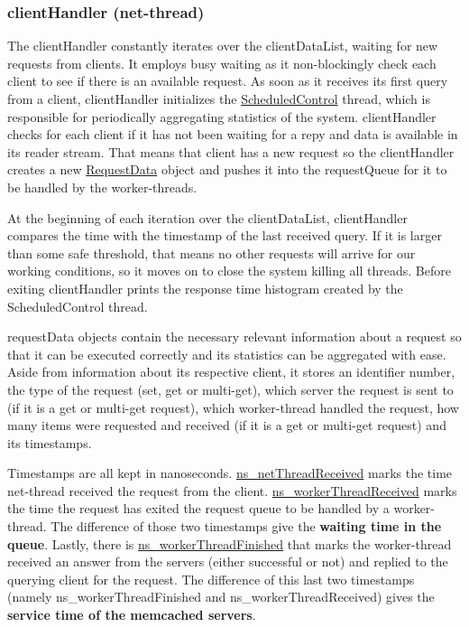 \documentclass[11pt,a4paper]{article}
\begin{document}
\subsubsection{clientHandler (net-thread)} \label{sec:ov-netthread}
The clientHandler constantly iterates over the clientDataList, waiting for new requests from clients. It employs busy waiting as it non-blockingly check each client to see if there is an available request. As soon as it receives its first query from a client, clientHandler initializes the \underline{ScheduledControl} thread, which is responsible for periodically aggregating statistics of the system. clientHandler checks for each client if it has not been waiting for a repy and data is available in its reader stream. That means that client has a new request so the clientHandler creates a new \underline{RequestData} object and pushes it into the requestQueue for it to be handled by the worker-threads.
\par
At the beginning of each iteration over the clientDataList, clientHandler compares the time with the timestamp of the last received query. If it is larger than some safe threshold, that means no other requests will arrive for our working conditions, so it moves on to close the system killing all threads. Before exiting clientHandler prints the response time histogram created by the ScheduledControl thread.
\par
requestData objects contain the necessary relevant information about a request so that it can be executed correctly and its statistics can be aggregated with ease. Aside from information about its respective client, it stores an identifier number, the type of the request (set, get or multi-get), which server the request is sent to (if it is a get or multi-get request), which worker-thread handled the request, how many items were requested and received (if it is a get or multi-get request) and its timestamps.
\par
Timestamps are all kept in nanoseconds. \underline{ns\_netThreadReceived} marks the time net-thread received the request from the client. \underline{ns\_workerThreadReceived} marks the time the request has exited the request queue to be handled by a worker-thread. The difference of those two timestamps give the \textbf{waiting time in the queue}. Lastly, there is \underline{ns\_workerThreadFinished} that marks the worker-thread received an answer from the servers (either successful or not) and replied to the querying client for the request. The difference of this last two timestamps (namely ns\_workerThreadFinished and ns\_workerThreadReceived) gives the \textbf{service time of the memcached servers}.
\end{document}
